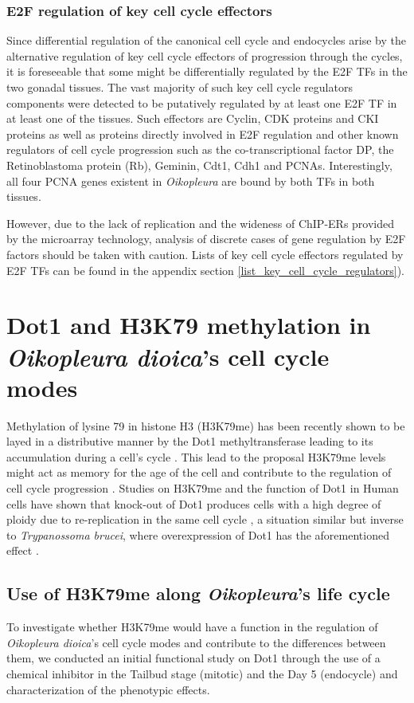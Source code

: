 \documentclass[11pt,twoside,a4paper]{report}
\begin{document}
		\subsubsection{E2F regulation of key cell cycle effectors}
		Since differential regulation of the canonical cell cycle and endocycles arise by the alternative regulation of key cell cycle effectors of progression through the cycles, it is foreseeable that some might be differentially regulated by the E2F TFs in the two gonadal tissues. The vast majority of such key cell cycle regulators components were detected to be putatively regulated by at least one E2F TF in at least one of the tissues. Such effectors are Cyclin, CDK proteins and CKI proteins as well as proteins directly involved in E2F regulation and other known regulators of cell cycle progression such as the co-transcriptional factor DP, the Retinoblastoma protein (Rb), Geminin, Cdt1, Cdh1 and PCNAs. Interestingly, all four PCNA genes existent in \textit{Oikopleura} are bound by both TFs in both tissues.
		
		However, due to the lack of replication and the wideness of ChIP-ERs provided by the microarray technology, analysis of discrete cases of gene regulation by E2F factors should be taken with caution. Lists of key cell cycle effectors regulated by E2F TFs can be found in the appendix section \ref{list_key_cell_cycle_regulators}).
		
\clearpage
\section{Dot1 and H3K79 methylation in \textit{Oikopleura dioica}'s cell cycle modes}
	Methylation of lysine 79 in histone H3 (H3K79me) has been recently shown to be layed in a distributive manner by the Dot1 methyltransferase leading to its accumulation during a cell's cycle \cite{Frederiks2008}. This lead to the proposal H3K79me levels might act as memory for the age of the cell and contribute to the regulation of cell cycle progression \cite{DeVos2011}. Studies on H3K79me and the function of Dot1 in Human cells have shown that knock-out of Dot1 produces cells with a high degree of ploidy due to re-replication in the same cell cycle \cite{Fu2013a}, a situation similar but inverse to \textit{Trypanossoma brucei}, where overexpression of Dot1 has the aforementioned effect \cite{Gassen2012}.
	
	\subsection{Use of H3K79me along \textit{Oikopleura}'s life cycle}
	To investigate whether H3K79me would have a function in the regulation of \textit{Oikopleura dioica}'s cell cycle modes and contribute to the differences between them, we conducted an initial functional study on Dot1 through the use of a chemical inhibitor in the Tailbud stage (mitotic) and the Day 5 (endocycle) and characterization of the phenotypic effects.
	
\end{document}
